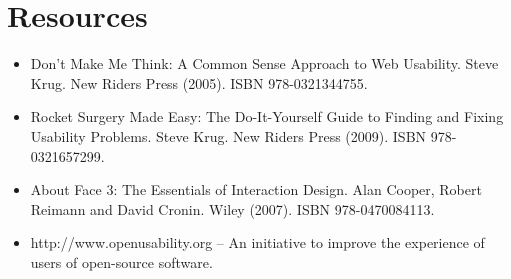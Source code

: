 \section*{Resources}
\begin{itemize}
 \item Don't Make Me Think: A Common Sense Approach to Web Usability. Steve Krug. New Riders Press (2005). ISBN 978-0321344755.
 \item Rocket Surgery Made Easy: The Do-It-Yourself Guide to Finding and Fixing Usability Problems. Steve Krug. New Riders Press (2009). ISBN 978-0321657299.
 \item About Face 3: The Essentials of Interaction Design. Alan Cooper, Robert Reimann and David Cronin. Wiley (2007). ISBN 978-0470084113.
 \item http://www.openusability.org – An initiative to improve the experience of users of open-source software.
\end{itemize}
